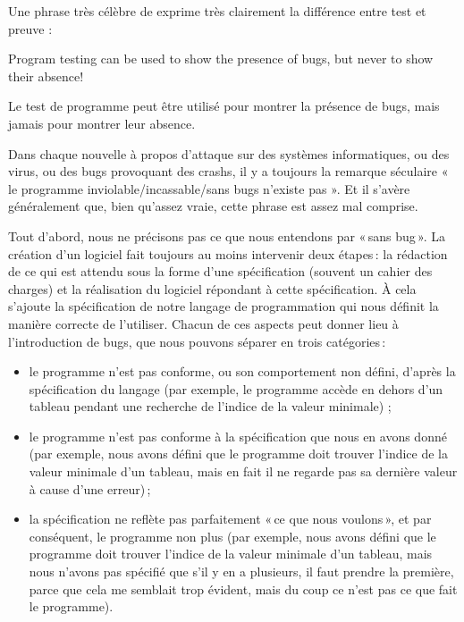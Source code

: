 Une phrase très célèbre de  exprime très clairement la différence entre
test et preuve :



\begin{Quotation}[Dijkstra]
Program testing can be used to show the presence of bugs, but never to show
their absence!
\end{Quotation}



Le test de programme peut être utilisé pour montrer la présence de bugs, mais
jamais pour montrer leur absence.





Dans chaque nouvelle à propos d'attaque sur des systèmes informatiques, ou
des virus, ou des bugs provoquant des crashs, il y a toujours la remarque
séculaire « le programme inviolable/incassable/sans bugs n'existe pas ». Et
il s'avère généralement que, bien qu'assez vraie, cette phrase est assez
mal comprise.



Tout d’abord, nous ne précisons pas ce que nous entendons par « sans bug ».
La création d’un logiciel fait toujours au moins intervenir deux étapes : la
rédaction de ce qui est attendu sous la forme d’une spécification (souvent
un cahier des charges) et la réalisation du logiciel répondant à cette
spécification. À cela s’ajoute la spécification de notre langage de
programmation qui nous définit la manière correcte de l’utiliser. Chacun de
ces aspects peut donner lieu à l’introduction de bugs, que nous pouvons
séparer en trois catégories :
\begin{itemize}
\item le programme n’est pas conforme, ou son comportement non défini,
      d’après la spécification du langage (par exemple, le programme accède
      en dehors d’un tableau pendant une recherche de l'indice de la valeur
      minimale) ;
\item le programme n’est pas conforme à la spécification que nous en avons
      donné (par exemple, nous avons défini que le programme doit trouver
      l'indice de la valeur minimale d’un tableau, mais en fait il ne
      regarde pas sa dernière valeur à cause d’une erreur) ;
\item la spécification ne reflète pas parfaitement « ce que nous voulons »,
      et par conséquent, le programme non plus (par exemple, nous avons
      défini que le programme doit trouver l'indice de la valeur minimale
      d’un tableau, mais nous n’avons pas spécifié que s’il y en a plusieurs,
      il faut prendre la première, parce que cela me semblait trop évident,
      mais du coup ce n’est pas ce que fait le programme).
\end{itemize}


